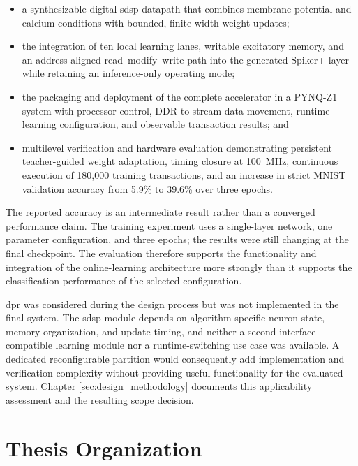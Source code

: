 \begin{itemize}
    \item a synthesizable digital \gls{sdsp} datapath that combines membrane-potential and calcium conditions with bounded, finite-width weight updates;
    \item the integration of ten local learning lanes, writable excitatory memory, and an address-aligned read--modify--write path into the generated Spiker+ layer while retaining an inference-only operating mode;
    \item the packaging and deployment of the complete accelerator in a PYNQ-Z1 system with processor control, DDR-to-stream data movement, runtime learning configuration, and observable transaction results; and
    \item multilevel verification and hardware evaluation demonstrating persistent teacher-guided weight adaptation, timing closure at 100~MHz, continuous execution of 180,000 training transactions, and an increase in strict MNIST validation accuracy from 5.9\% to 39.6\% over three epochs.
\end{itemize}

The reported accuracy is an intermediate result rather than a converged performance claim. The training experiment uses a single-layer network, one parameter configuration, and three epochs; the results were still changing at the final checkpoint. The evaluation therefore supports the functionality and integration of the online-learning architecture more strongly than it supports the classification performance of the selected configuration.

\Gls{dpr} was considered during the design process but was not implemented in the final system. The \gls{sdsp} module depends on algorithm-specific neuron state, memory organization, and update timing, and neither a second interface-compatible learning module nor a runtime-switching use case was available. A dedicated reconfigurable partition would consequently add implementation and verification complexity without providing useful functionality for the evaluated system. Chapter \ref{sec:design_methodology} documents this applicability assessment and the resulting scope decision.

\section{Thesis Organization}
\label{subsec:thesis-organization}

